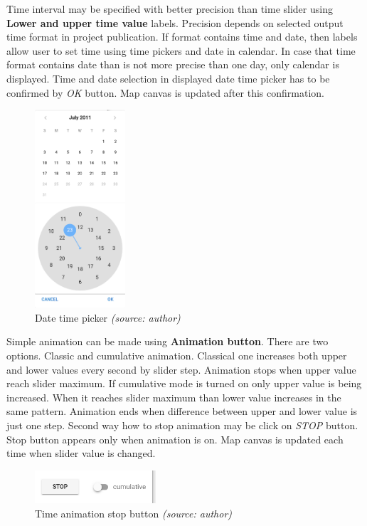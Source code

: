 Time interval may be specified with better precision than time 
slider using \textbf{Lower and upper time value} labels. Precision depends
on selected output time format in project publication. If format 
contains time and date, then labels allow user to set time using time
pickers and date in calendar. In case that time format contains date 
than is not more precise than one day, only calendar is displayed. 
Time and date 
selection in displayed date time picker has to be confirmed by 
\textit{OK} button. Map canvas is updated after this confirmation.

\begin{figure}[h!]
	\centering
	\includegraphics[width=0.3\textwidth]{./img/date-time-picker.png}
	\caption{Date time picker \textit{(source: author)}}
	\label{fig:date-time-picker}
\end{figure}

Simple animation can be made using \textbf{Animation button}. There are two 
options. Classic and cumulative animation. Classical one increases both 
upper and lower values every second by slider step. 
Animation stops when upper value reach slider maximum. If cumulative 
mode is turned on only upper value is being increased. When it reaches 
slider maximum than lower value increases in the same pattern.
Animation ends when difference between upper and lower value is just one 
step. Second  way how to stop animation may be click on \textit{STOP} button. 
Stop button appears only when animation is on. Map canvas is updated 
each time when slider value is changed.

\begin{figure}[h!]
	\centering
	\includegraphics[width=0.4\textwidth]{./img/time-animation-stop.png}
	\caption{Time animation stop button \textit{(source: author)}}
	\label{fig:time-animation-stop}
\end{figure}

